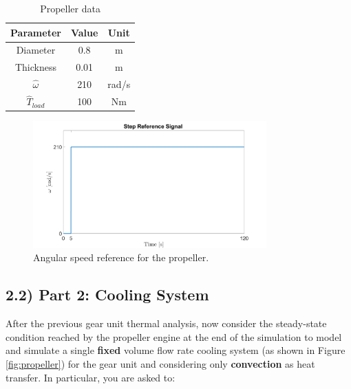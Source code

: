 \documentclass[11pt,a4paper,oneside]{article}
\begin{document}
\begin{table}[ht!]
    \centering
    \caption{Propeller data}
    \begin{tabular}{ |c|c|c| } 
        \hline
        \textbf{Parameter} & \textbf{Value} & \textbf{Unit}\\
        \hline
        Diameter & 0.8 & m  \\ 
        Thickness & 0.01 & m  \\ 
        $\hat{\omega}$ & 210 & rad/s \\
        $\hat{T}_{load}$ & 100 & Nm \\
        \hline
    \end{tabular}
    \label{tab:prop}
\end{table}

\begin{figure}[ht!]
    \centering
    \includegraphics[width=0.8\textwidth]{Figures/ReferenceSignal.png}
    \caption{\label{fig:refsignal} Angular speed reference for the propeller.}
\end{figure}

\subsection*{2.2) Part 2: Cooling System}
After the previous gear unit thermal analysis, now consider the steady-state condition reached by the propeller engine at the end of the simulation to model and simulate a single \textbf{fixed} volume flow rate cooling system (as shown in Figure \ref{fig:propeller}) for the gear unit and considering only \textbf{convection} as heat transfer. In particular, you are asked to:
\end{document}
